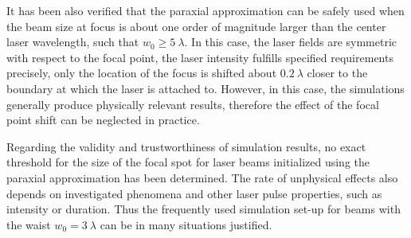 It has been also verified that the paraxial approximation can be safely used when the beam size at focus is about one order of magnitude larger than the center laser wavelength, such that $ w_0 \geq 5 \ \lambda $. In this case, the laser fields are symmetric with respect to the focal point, the laser intensity fulfills specified requirements precisely, only the location of the focus is shifted about $ 0.2 \ \lambda $ closer to the boundary at which the laser is attached to. However, in this case, the simulations generally produce physically relevant results, therefore the effect of the focal point shift can be neglected in practice.

Regarding the validity and trustworthiness of simulation results, no exact threshold for the size of the focal spot for laser beams initialized using the paraxial approximation has been determined. The rate of unphysical effects also depends on investigated phenomena and other laser pulse properties, such as intensity or duration. Thus the frequently used simulation set-up for beams with the waist $ w_0 = 3 \ \lambda $ can be in many situations justified.